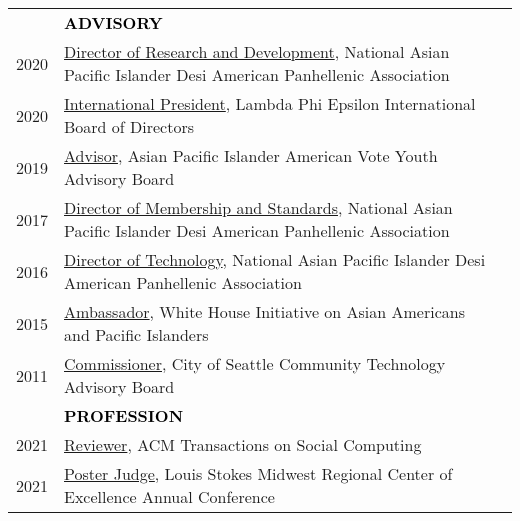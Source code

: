 \documentclass[11pt]{article}
\begin{document}
{{\begin{longtable}{Rp{0.75in}p{5.0in}}
& \textcolor{black}{\uppercase{\textbf{Advisory}}}\\
\footnotesize{2020} & \href{http://www.napahq.org/}{Director of Research and Development}, National Asian Pacific Islander Desi American Panhellenic Association\\

\footnotesize{2020} & \href{http://lambdaphiepsilon.com}{International President}, Lambda Phi Epsilon International Board of Directors\\

\footnotesize{2019} & \href{https://www.apiavote.org/youth-ambassadors}{Advisor}, Asian Pacific Islander American Vote Youth Advisory Board\\

\footnotesize{2017} & \href{http://www.napahq.org/}{Director of Membership and Standards}, National Asian Pacific Islander Desi American Panhellenic Association\\

\footnotesize{2016} & \href{http://www.napahq.org/}{Director of Technology}, National Asian Pacific Islander Desi American Panhellenic Association\\

\footnotesize{2015} & \href{https://obamawhitehouse.archives.gov/blog/2015/09/04/white-house-initiative-aapis-selects-23-young-leaders-serve-2015-2016-e3-ambassadors}{Ambassador}, White House Initiative on Asian Americans and Pacific Islanders\\

\footnotesize{2011} & \href{https://web.archive.org/web/20150911093548/https://ischool.uw.edu/alumni/impact-stories/informatics-grad-and-husky-promise-student-aims-deliver-it-resources}{Commissioner}, City of Seattle Community Technology Advisory Board\\

& \textcolor{black}{\uppercase{\textbf{Profession}}}\\
\footnotesize{2021} & 
\href{https://dl.acm.org/journal/tsc}{Reviewer}, ACM Transactions on Social Computing\\

\footnotesize{2021} & \href{https://lsmrce.org/events/annual/2021-annual/2021-conference-with-gratitude.aspx}{Poster Judge}, Louis Stokes Midwest Regional Center of Excellence Annual Conference\\


\end{longtable}}}
\end{document}
